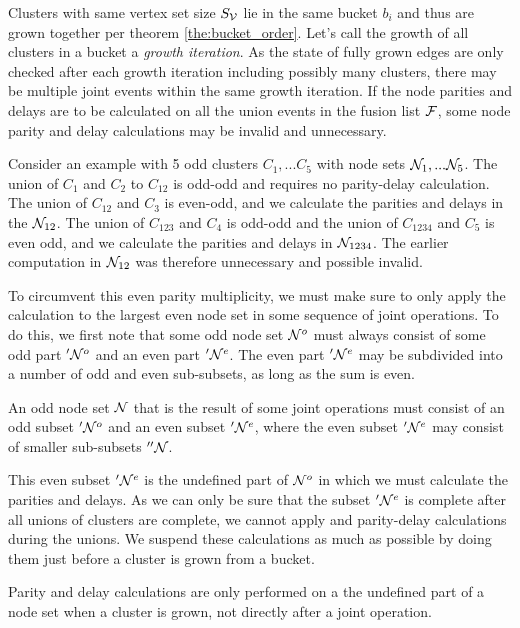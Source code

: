 Clusters with same vertex set size $S_{\mathcal{V}}$ lie in the same bucket $b_i$ and thus are grown together per theorem \ref{the:bucket_order}. Let's call the growth of all clusters in a bucket a \emph{growth iteration}. As the state of fully grown edges are only checked after each growth iteration including possibly many clusters, there may be multiple joint events within the same growth iteration. If the node parities and delays are to be calculated on all the union events in the fusion list $\mathcal{F}$, some node parity and delay calculations may be invalid and unnecessary.

Consider an example with 5 odd clusters $C_1, ... C_5$ with node sets $\mathcal{N}_1, ... \mathcal{N}_5$. The union of $C_1$ and $C_2$ to $C_{12}$ is odd-odd and requires no parity-delay calculation. The union of $C_{12}$ and $C_3$ is even-odd, and we calculate the parities and delays in the $\mathcal{N}_{12}$. The union of $C_{123}$ and $C_4$ is odd-odd and the union of $C_{1234}$ and $C_5$ is even odd, and we calculate the parities and delays in $\mathcal{N}_{1234}$. The earlier computation in $\mathcal{N}_{12}$ was therefore unnecessary and possible invalid.

To circumvent this even parity multiplicity, we must make sure to only apply the calculation to the largest even node set in some sequence of joint operations. To do this, we first note that some odd node set $\mathcal{N}^o$ must always consist of some odd part $'\mathcal{N}^o$ and an even part $'\mathcal{N}^e$. The even part $'\mathcal{N}^e$ may be subdivided into a number of odd and even sub-subsets, as long as the sum is even.
\begin{lemma}\label{lem:oddisevenodd}
  An odd node set $\mathcal{N}$ that is the result of some joint operations must consist of an odd subset $'\mathcal{N}^o$ and an even subset $'\mathcal{N}^e$, where the even subset $'\mathcal{N}^e$ may consist of smaller sub-subsets $''\mathcal{N}$.
\end{lemma}
This even subset $'\mathcal{N}^e$ is the undefined part of $\mathcal{N}^o$ in which we must calculate the parities and delays. As we can only be sure that the subset $'\mathcal{N}^e$ is complete after all unions of clusters are complete, we cannot apply and parity-delay calculations during the unions. We suspend these calculations as much as possible by doing them just before a cluster is grown from a bucket.

\begin{lemma}\label{lem:delaywhengrown}
  Parity and delay calculations are only performed on a the undefined part of a node set when a cluster is grown, not directly after a joint operation.
\end{lemma}

